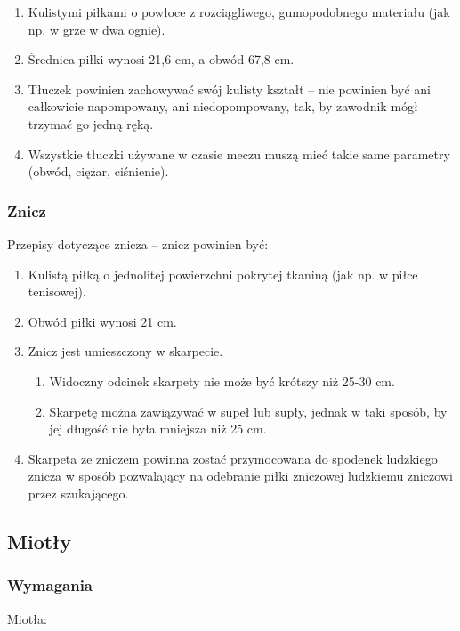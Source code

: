 \documentclass[12pt]{article}
\begin{document}
\begin{enumerate}
\item Kulistymi piłkami o powłoce z rozciągliwego, gumopodobnego materiału
(jak np. w grze w dwa ognie).

\item Średnica piłki wynosi 21,6 cm, a obwód 67,8 cm.

\item Tłuczek powinien zachowywać swój kulisty kształt -- nie powinien być
ani całkowicie napompowany, ani niedopompowany, tak, by zawodnik mógł
trzymać go jedną ręką.

\item Wszystkie tłuczki używane w czasie meczu muszą mieć takie same
parametry (obwód, ciężar, ciśnienie).
\end{enumerate}

\subsubsection{Znicz}
Przepisy dotyczące znicza -- znicz powinien być:

\begin{enumerate}
\item Kulistą piłką o jednolitej powierzchni pokrytej tkaniną (jak np. w
piłce tenisowej).

\item Obwód piłki wynosi 21 cm.

\item Znicz jest umieszczony w skarpecie.
  \begin{enumerate}
  \item Widoczny odcinek skarpety nie może być krótszy niż 25-30 cm.

  \item Skarpetę można zawiązywać w supeł lub supły, jednak w taki sposób,
by jej długość nie była mniejsza niż 25 cm.
    \end{enumerate}
\item Skarpeta ze zniczem powinna zostać przymocowana do spodenek ludzkiego
znicza w sposób pozwalający na odebranie piłki zniczowej ludzkiemu
zniczowi przez szukającego.
\end{enumerate}

\subsection{Miotły}

\subsubsection{Wymagania}
Miotła:
\end{document}
